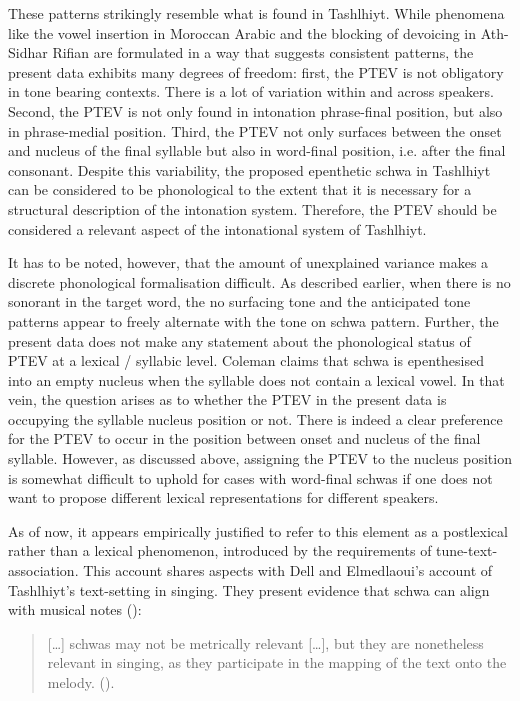These patterns strikingly resemble what is found in Tashlhiyt. While phenomena like the vowel insertion in Moroccan Arabic and the blocking of devoicing in Ath-Sidhar Rifian are formulated in a way that suggests consistent patterns, the present data exhibits many degrees of freedom: first, the PTEV is not obligatory in tone bearing contexts. There is a lot of variation within and across speakers. Second, the PTEV is not only found in intonation phrase-final position, but also in phrase-medial position. Third, the PTEV not only surfaces between the onset and nucleus of the final syllable but also in word-final position, i.e. after the final consonant. Despite this variability, the proposed epenthetic schwa in Tashlhiyt can be considered to be phonological to the extent that it is necessary for a structural description of the intonation system. Therefore, the PTEV should be considered a relevant aspect of the intonational system of Tashlhiyt. 

It has to be noted, however, that the amount of unexplained variance makes a discrete phonological formalisation difficult. As described earlier, when there is no sonorant in the target word, the no surfacing tone and the anticipated tone patterns appear to freely alternate with the tone on schwa pattern. Further, the present data does not make any statement about the phonological status of PTEV at a lexical / syllabic level. Coleman claims that schwa is epenthesised into an empty nucleus when the syllable does not contain a lexical vowel. In that vein, the question arises as to whether the PTEV in the present data is occupying the syllable nucleus position or not. There is indeed a clear preference for the PTEV to occur in the position between onset and nucleus of the final syllable. However, as discussed above, assigning the PTEV to the nucleus position is somewhat difficult to uphold for cases with word-final schwas if one does not want to propose different lexical representations for different speakers. 

As of now, it appears empirically justified to refer to this element as a postlexical rather than a lexical phenomenon, introduced by the requirements of tune-text-association. This account shares aspects with Dell and Elmedlaoui’s account of Tashlhiyt's text-setting in singing. They present evidence that schwa can align with musical notes (\citealt{DE2002}):

\newpage
\begin{quote}
[…] schwas may not be metrically relevant […], but they are nonetheless relevant in singing, as they participate in the mapping of the text onto the melody. (\citealt[152]{DE2002}).
\end{quote}

